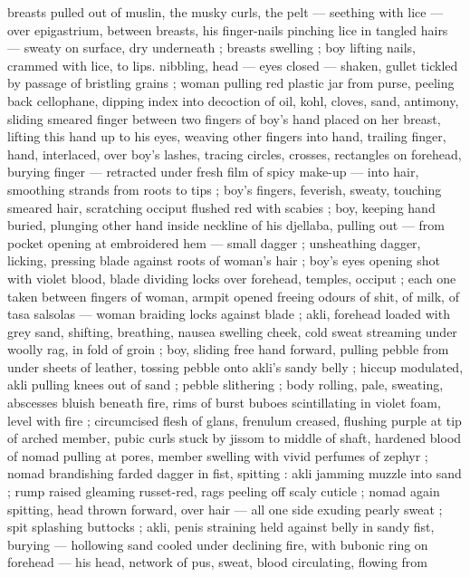 {breasts pulled out of muslin, the musky curls, the pelt --- seething 
with lice --- over epigastrium, between breasts, his finger-nails 
pinching lice in tangled hairs --- sweaty on surface, dry underneath 
; breasts swelling ; boy lifting nails, crammed with lice, to lips. 
nibbling, head --- eyes closed --- shaken, gullet tickled by passage 
of bristling grains ; woman pulling red plastic jar from purse, peeling 
back cellophane, dipping index into decoction of oil, kohl, cloves, 
sand, antimony, sliding smeared finger between two fingers of boy's 
hand placed on her breast, lifting this hand up to his eyes, weaving 
other fingers into hand, trailing finger, hand, interlaced, over boy's 
lashes, tracing circles, crosses, rectangles on forehead, burying 
finger --- retracted under fresh film of spicy make-up --- into hair, 
smoothing strands from roots to tips ; boy's fingers, feverish, sweaty, 
touching smeared hair, scratching occiput flushed red with scabies ; 
boy, keeping hand buried, plunging other hand inside neckline of his 
djellaba, pulling out --- from pocket opening at embroidered hem --- 
small dagger ; unsheathing dagger, licking, pressing blade against 
roots of woman's hair ; boy's eyes opening shot with violet blood, 
blade dividing locks over forehead, temples, occiput ; each one taken 
between fingers of woman, armpit opened freeing odours of shit, of 
milk, of tasa salsolas --- woman braiding locks against blade ; akli, 
forehead loaded with grey sand, shifting, breathing, nausea swelling 
cheek, cold sweat streaming under woolly rag, in fold of groin ; boy, 
sliding free hand forward, pulling pebble from under sheets of 
leather, tossing pebble onto akli's sandy belly ; hiccup modulated, 
akli pulling knees out of sand ; pebble slithering ; body rolling, pale, 
sweating, abscesses bluish beneath fire, rims of burst buboes 
scintillating in violet foam, level with fire ; circumcised flesh of glans, 
frenulum creased, flushing purple at tip of arched member, pubic 
curls stuck by jissom to middle of shaft, hardened blood of nomad 
pulling at pores, member swelling with vivid perfumes of zephyr ; 
nomad brandishing farded dagger in fist, spitting : akli jamming 
muzzle into sand ; rump raised gleaming russet-red, rags peeling off 
scaly cuticle ; nomad again spitting, head thrown forward, over hair 
--- all one side exuding pearly sweat ; spit splashing buttocks ; akli, 
penis straining held against belly in sandy fist, burying --- hollowing 
sand cooled under declining fire, with bubonic ring on forehead --- 
his head, network of pus, sweat, blood circulating, flowing from 
}
